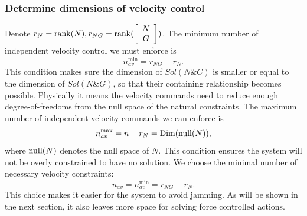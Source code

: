 \subsubsection{Determine dimensions of velocity control} %
\label{subsub:determine_dimensions_of_velocity_control}
Denote $r_N={\rm rank}(N), r_{NG}={\rm rank}(\left[ {\begin{array}{*{20}{c}}{N }\\G\end{array}}\right])$. The minimum number of independent velocity control we must enforce is
\begin{equation}
\label{eq:nav_min}
  {n^{\min}_{av}} = r_{NG}-r_N.
\end{equation}
This condition makes sure the dimension of $Sol(N\&C)$ is smaller or equal to the dimension of $Sol(N\&G)$, so that their containing relationship becomes possible. Physically it means the velocity commands need to reduce enough degree-of-freedoms from the null space of the natural constraints. The maximum number of independent velocity commands we can enforce is
\begin{equation}
\label{eq:nav_max}
  n^{\max}_{av} = n - r_N={\rm Dim}({\rm null}(N)),
\end{equation}
where ${\rm null}(N)$ denotes the null space of $N$. This condition ensures the system will not be overly constrained to have no solution.
We choose the minimal number of necessary velocity constraints:
\begin{equation}
\label{eq:choice_of_nav}
n_{av}=n^{\min}_{av} =r_{NG}-r_N.
\end{equation}
This choice makes it easier for the system to avoid jamming. As will be shown in the next section, it also leaves more space for solving force controlled actions.


